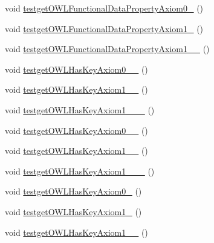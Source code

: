 \begin{DoxyCompactItemize}
void \hyperlink{classorg_1_1semanticweb_1_1owlapi_1_1api_1_1test_1_1_null_check_test_case_aab7fd59b8ef9be334934e1065c8b841e}{testget\-O\-W\-L\-Functional\-Data\-Property\-Axiom0\-\_} ()
\item 
void \hyperlink{classorg_1_1semanticweb_1_1owlapi_1_1api_1_1test_1_1_null_check_test_case_a3aa156e77bf3862b6dd917f5d70f61a4}{testget\-O\-W\-L\-Functional\-Data\-Property\-Axiom1\-\_} ()
\item 
void \hyperlink{classorg_1_1semanticweb_1_1owlapi_1_1api_1_1test_1_1_null_check_test_case_a699695360730fb1305a46729dccedd0c}{testget\-O\-W\-L\-Functional\-Data\-Property\-Axiom1\-\_\-\_} ()
\item 
void \hyperlink{classorg_1_1semanticweb_1_1owlapi_1_1api_1_1test_1_1_null_check_test_case_a2ecb9ed78aabeb832372139cfb87fb59}{testget\-O\-W\-L\-Has\-Key\-Axiom0\-\_\-\_} ()
\item 
void \hyperlink{classorg_1_1semanticweb_1_1owlapi_1_1api_1_1test_1_1_null_check_test_case_a206ab17e76a42a264bfdceb8eef81e1b}{testget\-O\-W\-L\-Has\-Key\-Axiom1\-\_\-\_} ()
\item 
void \hyperlink{classorg_1_1semanticweb_1_1owlapi_1_1api_1_1test_1_1_null_check_test_case_a0ef9928f1d527b316ca44ac10226d6a1}{testget\-O\-W\-L\-Has\-Key\-Axiom1\-\_\-\_\-\_} ()
\item 
void \hyperlink{classorg_1_1semanticweb_1_1owlapi_1_1api_1_1test_1_1_null_check_test_case_ad0640bfd0e1070b4666c9c136f7d0b43}{testget\-O\-W\-L\-Has\-Key\-Axiom0\-\_\-\_} ()
\item 
void \hyperlink{classorg_1_1semanticweb_1_1owlapi_1_1api_1_1test_1_1_null_check_test_case_af40dde3841a31dac4795ee743913e4f6}{testget\-O\-W\-L\-Has\-Key\-Axiom1\-\_\-\_} ()
\item 
void \hyperlink{classorg_1_1semanticweb_1_1owlapi_1_1api_1_1test_1_1_null_check_test_case_a17d7ae661c9768289075942c052b12b8}{testget\-O\-W\-L\-Has\-Key\-Axiom1\-\_\-\_\-\_} ()
\item 
void \hyperlink{classorg_1_1semanticweb_1_1owlapi_1_1api_1_1test_1_1_null_check_test_case_a6ab86a1f805ff08a746478c102b7965b}{testget\-O\-W\-L\-Has\-Key\-Axiom0\-\_} ()
\item 
void \hyperlink{classorg_1_1semanticweb_1_1owlapi_1_1api_1_1test_1_1_null_check_test_case_a48921ccb3ffe22fefadb8eeae5237d3f}{testget\-O\-W\-L\-Has\-Key\-Axiom1\-\_} ()
\item 
void \hyperlink{classorg_1_1semanticweb_1_1owlapi_1_1api_1_1test_1_1_null_check_test_case_a0c1465f7c76c7609ac84dc74b89785e8}{testget\-O\-W\-L\-Has\-Key\-Axiom1\-\_\-\_} ()

\end{DoxyCompactItemize}
